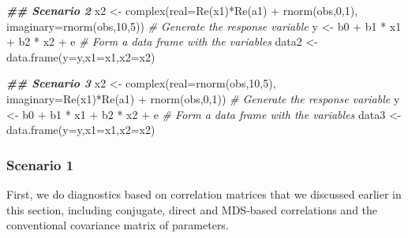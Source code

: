 \documentclass[
]{book}
\newenvironment{Shaded}{\begin{snugshade}}{\end{snugshade}}
\newcommand{\AttributeTok}[1]{\textcolor[rgb]{0.77,0.63,0.00}{#1}}
\newcommand{\CommentTok}[1]{\textcolor[rgb]{0.56,0.35,0.01}{\textit{#1}}}
\newcommand{\DecValTok}[1]{\textcolor[rgb]{0.00,0.00,0.81}{#1}}
\newcommand{\DocumentationTok}[1]{\textcolor[rgb]{0.56,0.35,0.01}{\textbf{\textit{#1}}}}
\newcommand{\FunctionTok}[1]{\textcolor[rgb]{0.00,0.00,0.00}{#1}}
\newcommand{\NormalTok}[1]{#1}
\newcommand{\OtherTok}[1]{\textcolor[rgb]{0.56,0.35,0.01}{#1}}
\newcommand{\SpecialCharTok}[1]{\textcolor[rgb]{0.00,0.00,0.00}{#1}}
\begin{document}
\begin{Shaded}
\begin{Highlighting}[]
\DocumentationTok{\#\# Scenario 2}
\NormalTok{x2 }\OtherTok{\textless{}{-}} \FunctionTok{complex}\NormalTok{(}\AttributeTok{real=}\FunctionTok{Re}\NormalTok{(x1)}\SpecialCharTok{*}\FunctionTok{Re}\NormalTok{(a1) }\SpecialCharTok{+} \FunctionTok{rnorm}\NormalTok{(obs,}\DecValTok{0}\NormalTok{,}\DecValTok{1}\NormalTok{),}
              \AttributeTok{imaginary=}\FunctionTok{rnorm}\NormalTok{(obs,}\DecValTok{10}\NormalTok{,}\DecValTok{5}\NormalTok{))}
\CommentTok{\# Generate the response variable}
\NormalTok{y }\OtherTok{\textless{}{-}}\NormalTok{ b0 }\SpecialCharTok{+}\NormalTok{ b1 }\SpecialCharTok{*}\NormalTok{ x1 }\SpecialCharTok{+}\NormalTok{ b2 }\SpecialCharTok{*}\NormalTok{ x2 }\SpecialCharTok{+}\NormalTok{ e}
\CommentTok{\# Form a data frame with the variables}
\NormalTok{data2 }\OtherTok{\textless{}{-}} \FunctionTok{data.frame}\NormalTok{(}\AttributeTok{y=}\NormalTok{y,}\AttributeTok{x1=}\NormalTok{x1,}\AttributeTok{x2=}\NormalTok{x2)}

\DocumentationTok{\#\# Scenario 3}
\NormalTok{x2 }\OtherTok{\textless{}{-}} \FunctionTok{complex}\NormalTok{(}\AttributeTok{real=}\FunctionTok{rnorm}\NormalTok{(obs,}\DecValTok{10}\NormalTok{,}\DecValTok{5}\NormalTok{),}
              \AttributeTok{imaginary=}\FunctionTok{Re}\NormalTok{(x1)}\SpecialCharTok{*}\FunctionTok{Re}\NormalTok{(a1) }\SpecialCharTok{+} \FunctionTok{rnorm}\NormalTok{(obs,}\DecValTok{0}\NormalTok{,}\DecValTok{1}\NormalTok{))}
\CommentTok{\# Generate the response variable}
\NormalTok{y }\OtherTok{\textless{}{-}}\NormalTok{ b0 }\SpecialCharTok{+}\NormalTok{ b1 }\SpecialCharTok{*}\NormalTok{ x1 }\SpecialCharTok{+}\NormalTok{ b2 }\SpecialCharTok{*}\NormalTok{ x2 }\SpecialCharTok{+}\NormalTok{ e}
\CommentTok{\# Form a data frame with the variables}
\NormalTok{data3 }\OtherTok{\textless{}{-}} \FunctionTok{data.frame}\NormalTok{(}\AttributeTok{y=}\NormalTok{y,}\AttributeTok{x1=}\NormalTok{x1,}\AttributeTok{x2=}\NormalTok{x2)}
\end{Highlighting}
\end{Shaded}

\hypertarget{scenario-1}{%
\subsubsection*{Scenario 1}\label{scenario-1}}

First, we do diagnostics based on correlation matrices that we discussed earlier in this section, including conjugate, direct and MDS-based correlations and the conventional covariance matrix of parameters.
\end{document}
